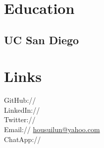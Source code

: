 \documentclass[]{deedy-resume-openfont}
\begin{document}
%
%
\lastupdated

%
%



%
%

\begin{minipage}[t]{0.33\textwidth} 


\section{Education} 

\subsection{UC San Diego}
\sectionsep


\section{Links} 
GitHub:// \href{https://github.com/jonwho}{} \\
LinkedIn://  \href{https://www.linkedin.com/in/jonwho}{} \\
Twitter://  \href{https://twitter.com/lj080805}{} \\
Email:// \href{mailto:housuilun@yahoo.com}{housuilun@yahoo.com} \\
ChatApp://\href{https://playwithfire.firebaseapp.com/}{}
\sectionsep



\end{minipage}
\end{document}

